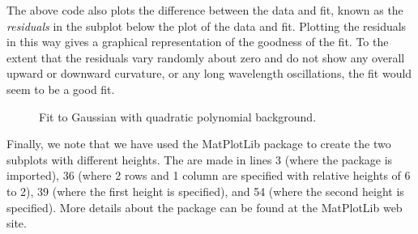 \documentclass[letterpaper,10pt,english]{sphinxmanual}
\begin{document}
The above code also plots the difference between the data and fit, known as the \emph{residuals} in the subplot below the plot of the data and fit.  Plotting the residuals in this way gives a graphical representation of the goodness of the fit.  To the extent that the residuals vary randomly about zero and do not show any overall upward or downward curvature, or any long wavelength oscillations, the fit would seem to be a good fit.
\begin{figure}[htbp]
\centering
\capstart

\caption{Fit to Gaussian with quadratic polynomial background.}\label{chap8/chap8_fitting:fig-fitspectrum}\end{figure}

Finally, we note that we have used the MatPlotLib package  to create the two subplots with different heights.  The  are made in lines 3 (where the package is imported), 36 (where 2 rows and 1 column are specified with relative heights of 6 to 2), 39 (where the first  height is specified), and 54 (where the second  height is specified).  More details about the  package can be found at the MatPlotLib web site.
\newpage
\end{document}
